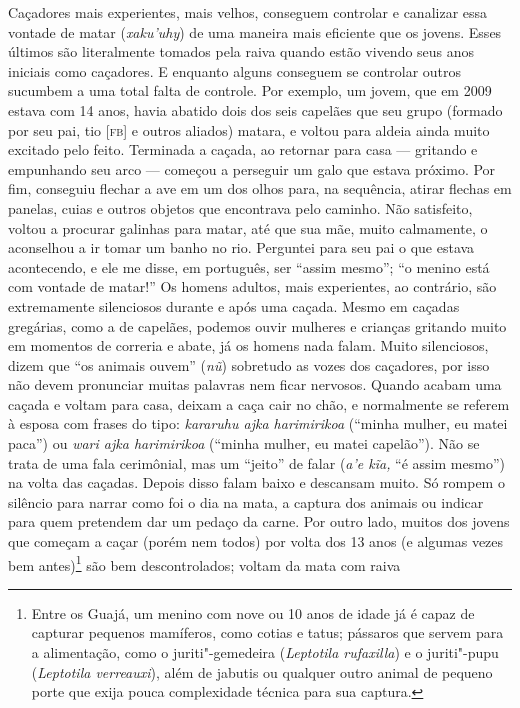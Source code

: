 Caçadores mais experientes, mais velhos, conseguem controlar e canalizar
essa vontade de matar (\emph{xaku'uhy}) de uma maneira mais eficiente
que os jovens. Esses últimos são literalmente tomados pela raiva quando
estão vivendo seus anos iniciais como caçadores. E enquanto alguns
conseguem se controlar outros sucumbem a uma total falta de controle.
Por exemplo, um jovem, que em 2009 estava com 14 anos, havia abatido
dois dos seis capelães que seu grupo (formado por seu pai, tio {[}\textsc{fb}{]}
e outros aliados) matara, e voltou para aldeia ainda muito excitado pelo
feito. Terminada a caçada, ao retornar para casa --- gritando e empunhando
seu arco --- começou a perseguir um galo que estava próximo. Por fim,
conseguiu flechar a ave em um dos olhos para, na sequência, atirar
flechas em panelas, cuias e outros objetos que encontrava pelo caminho.
Não satisfeito, voltou a procurar galinhas para matar, até que sua mãe,
muito calmamente, o aconselhou a ir tomar um banho no rio. Perguntei
para seu pai o que estava acontecendo, e ele me disse, em português, ser
``assim mesmo''; ``o menino está com vontade de matar!'' Os homens adultos,
mais experientes, ao contrário, são extremamente silenciosos durante e
após uma caçada. Mesmo em caçadas gregárias, como a de capelães, podemos
ouvir mulheres e crianças gritando muito em momentos de correria e
abate, já os homens nada falam. Muito silenciosos, dizem que ``os animais
ouvem'' (\emph{nũ}) sobretudo as vozes dos caçadores, por isso não devem
pronunciar muitas palavras nem ficar nervosos. Quando acabam uma caçada
e voltam para casa, deixam a caça cair no chão, e normalmente se referem
à esposa com frases do tipo: \emph{kararuhu ajka harimirikoa} (``minha
mulher, eu matei paca'') ou \emph{wari ajka harimirikoa} (``minha
mulher, eu matei capelão''). Não se trata de uma fala cerimônial, mas um
``jeito'' de falar (\emph{a'e kĩa,} ``é assim mesmo'') na volta das
caçadas. Depois disso falam baixo e descansam muito. Só rompem o
silêncio para narrar como foi o dia na mata, a captura dos animais ou
indicar para quem pretendem dar um pedaço da carne. Por outro lado,
muitos dos jovens que começam a caçar (porém nem todos) por volta dos 13
anos (e algumas vezes bem antes)\footnote{Entre os Guajá, um menino com
  nove ou 10 anos de idade já é capaz de capturar pequenos mamíferos,
  como cotias e tatus; pássaros que servem para a alimentação, como o
  juriti"-gemedeira (\emph{Leptotila rufaxilla}) e o juriti"-pupu
  (\emph{Leptotila verreauxi}), além de jabutis ou qualquer outro animal
  de pequeno porte que exija pouca complexidade técnica para sua
  captura.} são bem descontrolados; voltam da mata com raiva
